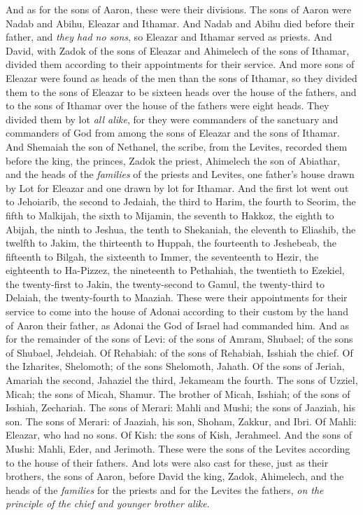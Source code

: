 \begin{biblechapter} %
 And as for the sons of Aaron, these were their divisions. The sons of Aaron were Nadab and Abihu, Eleazar and Ithamar.
\verse And Nadab and Abihu died before their father, and \textit{they had no sons}, so Eleazar and Ithamar served as priests.
\verse And David, with Zadok of the sons of Eleazar and Ahimelech of the sons of Ithamar, divided them according to their appointments for their service.
\verse And more sons of Eleazar were found as heads of the men than the sons of Ithamar, so they divided them to the sons of Eleazar to be sixteen heads over the house of the fathers, and to the sons of Ithamar over the house of the fathers were eight heads.
\verse They divided them by lot \textit{all alike}, for they were commanders of the sanctuary and commanders of God from among the sons of Eleazar and the sons of Ithamar.
\verse And Shemaiah the son of Nethanel, the scribe, from the Levites, recorded them before the king, the princes, Zadok the priest, Ahimelech the son of Abiathar, and the heads of the \textit{families} of the priests and Levites, one father’s house drawn by Lot for Eleazar and one drawn by lot for Ithamar.
\verse And the first lot went out to Jehoiarib, the second to Jedaiah,
\verse the third to Harim, the fourth to Seorim,
\verse the fifth to Malkijah, the sixth to Mijamin,
\verse the seventh to Hakkoz, the eighth to Abijah,
\verse the ninth to Jeshua, the tenth to Shekaniah,
\verse the eleventh to Eliashib, the twelfth to Jakim,
\verse the thirteenth to Huppah, the fourteenth to Jeshebeab,
\verse the fifteenth to Bilgah, the sixteenth to Immer,
\verse the seventeenth to Hezir, the eighteenth to Ha-Pizzez,
\verse the nineteenth to Pethahiah, the twentieth to Ezekiel,
\verse the twenty-first to Jakin, the twenty-second to Gamul,
\verse the twenty-third to Delaiah, the twenty-fourth to Maaziah.
\verse These were their appointments for their service to come into the house of Adonai according to their custom by the hand of Aaron their father, as Adonai the God of Israel had commanded him.
\verse And as for the remainder of the sons of Levi: of the sons of Amram, Shubael; of the sons of Shubael, Jehdeiah.
\verse Of Rehabiah: of the sons of Rehabiah, Isshiah the chief.
\verse Of the Izharites, Shelomoth; of the sons Shelomoth, Jahath.
\verse Of the sons of Jeriah, Amariah the second, Jahaziel the third, Jekameam the fourth.
\verse The sons of Uzziel, Micah; the sons of Micah, Shamur.
\verse The brother of Micah, Isshiah; of the sons of Isshiah, Zechariah.
\verse The sons of Merari: Mahli and Mushi; the sons of Jaaziah, his son.
\verse The sons of Merari: of Jaaziah, his son, Shoham, Zakkur, and Ibri.
\verse Of Mahli: Eleazar, who had no sons.
\verse Of Kish: the sons of Kish, Jerahmeel.
\verse And the sons of Mushi: Mahli, Eder, and Jerimoth. These were the sons of the Levites according to the house of their fathers.
\verse And lots were also cast for these, just as their brothers, the sons of Aaron, before David the king, Zadok, Ahimelech, and the heads of the \textit{families} for the priests and for the Levites the fathers, \textit{on the principle of the chief and younger brother alike}.
\end{biblechapter}

